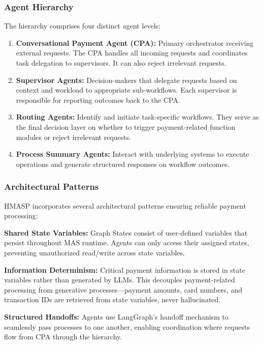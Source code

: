 \subsubsection{Agent Hierarchy}

The hierarchy comprises four distinct agent levels:

\begin{enumerate}[leftmargin=*]
    \item \textbf{Conversational Payment Agent (CPA):} Primary orchestrator receiving external requests. The CPA handles all incoming requests and coordinates task delegation to supervisors. It can also reject irrelevant requests.
    
    \item \textbf{Supervisor Agents:} Decision-makers that delegate requests based on context and workload to appropriate sub-workflows. Each supervisor is responsible for reporting outcomes back to the CPA.
    
    \item \textbf{Routing Agents:} Identify and initiate task-specific workflows. They serve as the final decision layer on whether to trigger payment-related function modules or reject irrelevant requests.
    
    \item \textbf{Process Summary Agents:} Interact with underlying systems to execute operations and generate structured responses on workflow outcomes.
\end{enumerate}

\subsubsection{Architectural Patterns}

HMASP incorporates several architectural patterns ensuring reliable payment processing:

\textbf{Shared State Variables:} Graph States consist of user-defined variables that persist throughout MAS runtime. Agents can only access their assigned states, preventing unauthorized read/write across state variables.

\textbf{Information Determinism:} Critical payment information is stored in state variables rather than generated by LLMs. This decouples payment-related processing from generative processes---payment amounts, card numbers, and transaction IDs are retrieved from state variables, never hallucinated.

\textbf{Structured Handoffs:} Agents use LangGraph's handoff mechanism to seamlessly pass processes to one another, enabling coordination where requests flow from CPA through the hierarchy.

